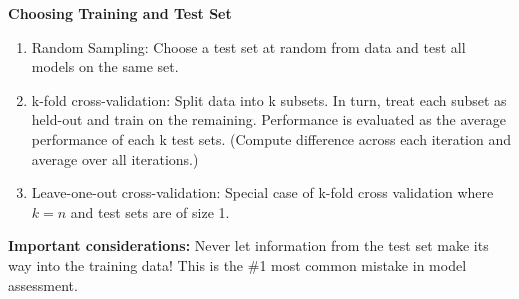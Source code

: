 \documentclass{article}
\begin{document}
\textbf{Choosing Training and Test Set}
\begin{enumerate}
    \item Random Sampling: Choose a test set at random from data and test all models on the same set.
    \item k-fold cross-validation: Split data into k subsets. In turn, treat each subset as held-out and train on the remaining. Performance is evaluated as the average performance of each k test sets. (Compute difference across each iteration and average over all iterations.)
    \item Leave-one-out cross-validation: Special case of k-fold cross validation where $k = n$ and test sets are of size 1.
\end{enumerate}
\textbf{Important considerations:}
Never let information from the test set make its way into the training data! This is the \#1 most common mistake in model assessment.\\
\end{document}

